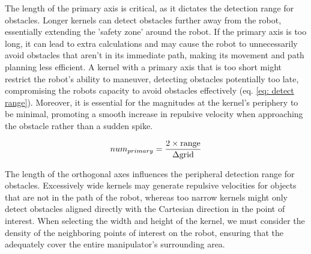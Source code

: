 \documentclass[]{article}
\begin{document}
The length of the primary axis is critical, as it dictates the detection range for obstacles. Longer kernels can detect obstacles further away
from the robot, essentially extending the ’safety zone’ around the robot. If the primary axis is too long, it can lead to extra calculations and may cause the robot to unnecessarily avoid obstacles that aren't in its immediate path, making its movement and path planning less efficient. A kernel with a primary axis that is too short might restrict the robot's ability to maneuver, detecting obstacles potentially too late, compromising the robots capacity to avoid obstacles effectively (eq. \ref{eq: detect range}). Moreover, it is essential for the magnitudes at the kernel's periphery to be minimal, promoting a smooth increase in repulsive velocity when approaching the obstacle rather than a sudden spike.

\begin{equation}
	\label{eq: detect range}
	num_{primary} = \frac{2 \times \mathrm{range}}{\Delta \mathrm{grid}}\\
\end{equation}


The length of the orthogonal axes influences the peripheral detection range for obstacles. Excessively wide kernels may generate repulsive velocities for objects that are not in the path of the robot, whereas too narrow kernels might only detect obstacles aligned directly with the Cartesian direction in the point of interest. When selecting the width and height of the kernel, we must consider the density of the neighboring points of interest on the robot, ensuring that the  adequately cover the entire manipulator's surrounding area.


\end{document}
